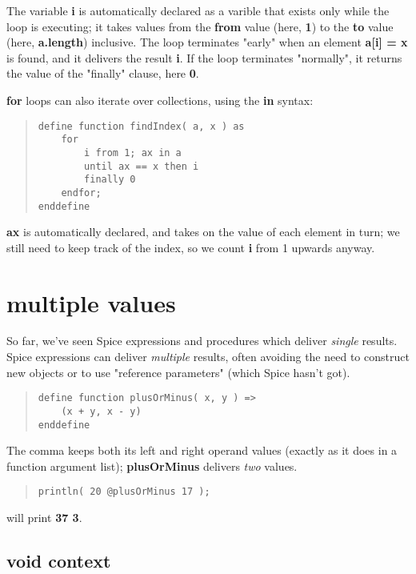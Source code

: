 \documentclass{report}
\begin{document}
The variable {\bf i} is automatically declared as a varible that exists only while
the loop is executing; it takes values from the {\bf from} value (here, {\bf 1}) to
the {\bf to} value (here, {\bf a.length}) inclusive. The loop terminates "early" when
an element {\bf a{[}i{]} = x} is found, and it delivers the result {\bf i}. If the loop
terminates "normally", it returns the value of the "finally" clause, here
{\bf 0}.

{\bf for} loops can also iterate over collections, using the {\bf in} syntax:

\begin{quote}
\begin{verbatim}
define function findIndex( a, x ) as
    for
        i from 1; ax in a
        until ax == x then i
        finally 0
    endfor;
enddefine
\end{verbatim}
\end{quote}


{\bf ax} is automatically declared, and takes on the value of each element in
turn; we still need to keep track of the index, so we count {\bf i} from 1
upwards anyway.\chapter{multiple values}


So far, we've seen Spice expressions and procedures which deliver {\em single}
results. Spice expressions can deliver {\em multiple} results, often avoiding the
need to construct new objects or to use "reference parameters" (which Spice
hasn't got).

\begin{quote}
\begin{verbatim}
define function plusOrMinus( x, y ) =>
    (x + y, x - y)
enddefine
\end{verbatim}
\end{quote}


The comma keeps both its left and right operand values (exactly as it does in
a function argument list); {\bf plusOrMinus} delivers {\em two} values.

\begin{quote}
\begin{verbatim}
println( 20 @plusOrMinus 17 );
\end{verbatim}
\end{quote}


will print {\bf 37 3}.

\section{void context}
\end{document}
